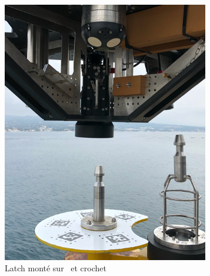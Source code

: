 				\begin{figure}[!htb]
					\centering
					\begin{subfigure}[b]{0.43\textwidth}
						\centering
						\includegraphics[width=0.99\textwidth]{imgs/latch_unlatched.png}
						\caption{Latch monté sur \atoll{} et crochet}
					\end{subfigure}
					\begin{subfigure}[b]{0.38\textwidth}
						\centering

\end{subfigure}
\end{figure}
